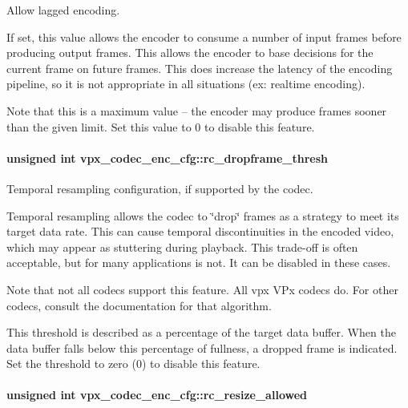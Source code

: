 Allow lagged encoding. 

If set, this value allows the encoder to consume a number of input frames before producing output frames. This allows the encoder to base decisions for the current frame on future frames. This does increase the latency of the encoding pipeline, so it is not appropriate in all situations (ex\+: realtime encoding).

Note that this is a maximum value -- the encoder may produce frames sooner than the given limit. Set this value to 0 to disable this feature. 
\paragraph[{\texorpdfstring{rc\+\_\+dropframe\+\_\+thresh}{rc_dropframe_thresh}}]{\setlength{\rightskip}{0pt plus 5cm}unsigned int vpx\+\_\+codec\+\_\+enc\+\_\+cfg\+::rc\+\_\+dropframe\+\_\+thresh}\hypertarget{structvpx__codec__enc__cfg_a619269f9a6904de58c4790e6806a3905}{}\label{structvpx__codec__enc__cfg_a619269f9a6904de58c4790e6806a3905}


Temporal resampling configuration, if supported by the codec. 

Temporal resampling allows the codec to \char`\"{}drop\char`\"{} frames as a strategy to meet its target data rate. This can cause temporal discontinuities in the encoded video, which may appear as stuttering during playback. This trade-\/off is often acceptable, but for many applications is not. It can be disabled in these cases.

Note that not all codecs support this feature. All vpx V\+Px codecs do. For other codecs, consult the documentation for that algorithm.

This threshold is described as a percentage of the target data buffer. When the data buffer falls below this percentage of fullness, a dropped frame is indicated. Set the threshold to zero (0) to disable this feature. 
\paragraph[{\texorpdfstring{rc\+\_\+resize\+\_\+allowed}{rc_resize_allowed}}]{\setlength{\rightskip}{0pt plus 5cm}unsigned int vpx\+\_\+codec\+\_\+enc\+\_\+cfg\+::rc\+\_\+resize\+\_\+allowed}\hypertarget{structvpx__codec__enc__cfg_a02a4e2f18fb0fdfff44df8b0d9a99d6c}{}\label{structvpx__codec__enc__cfg_a02a4e2f18fb0fdfff44df8b0d9a99d6c}



